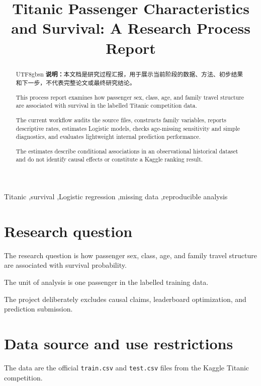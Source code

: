 \documentclass[preprint,12pt,authoryear]{elsarticle}
\begin{document}
\begin{frontmatter}

\title{Titanic Passenger Characteristics and Survival: A Research Process Report}

\begin{abstract}
\begin{CJK*}{UTF8}{gbsn}
\textbf{说明：}本文档是研究过程汇报，用于展示当前阶段的数据、方法、初步结果和下一步，不代表完整论文或最终研究结论。
\end{CJK*}

This process report examines how passenger sex, class, age, and family travel structure are associated with survival in the labelled Titanic competition data.

The current workflow audits the source files, constructs family variables, reports descriptive rates, estimates Logistic models, checks age-missing sensitivity and simple diagnostics, and evaluates lightweight internal prediction performance.

The estimates describe conditional associations in an observational historical dataset and do not identify causal effects or constitute a Kaggle ranking result.
\end{abstract}

\begin{keyword}
Titanic \sep survival \sep Logistic regression \sep missing data \sep reproducible analysis
\end{keyword}

\end{frontmatter}

\section{Research question}

The research question is how passenger sex, class, age, and family travel structure are associated with survival probability.

The unit of analysis is one passenger in the labelled training data.

The project deliberately excludes causal claims, leaderboard optimization, and prediction submission.

\section{Data source and use restrictions}

The data are the official \texttt{train.csv} and \texttt{test.csv} files from the Kaggle Titanic competition.
\end{document}
